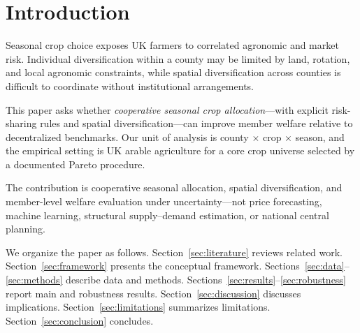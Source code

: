 \section{Introduction}
\label{sec:introduction}

Seasonal crop choice exposes UK farmers to correlated agronomic and market risk.
Individual diversification within a county may be limited by land, rotation, and local
agronomic constraints, while spatial diversification across counties is difficult to
coordinate without institutional arrangements.

This paper asks whether \emph{cooperative seasonal crop allocation}---with explicit
risk-sharing rules and spatial diversification---can improve member welfare relative to
decentralized benchmarks.
Our unit of analysis is county $\times$ crop $\times$ season, and the empirical setting
is UK arable agriculture for a core crop universe selected by a documented Pareto procedure.

\coppercontrib{}
The contribution is cooperative seasonal allocation, spatial diversification, and
member-level welfare evaluation under uncertainty---not price forecasting, machine learning,
structural supply--demand estimation, or national central planning.

We organize the paper as follows.
Section~\ref{sec:literature} reviews related work.
Section~\ref{sec:framework} presents the conceptual framework.
Sections~\ref{sec:data}--\ref{sec:methods} describe data and methods.
Sections~\ref{sec:results}--\ref{sec:robustness} report main and robustness results.
Section~\ref{sec:discussion} discusses implications.
Section~\ref{sec:limitations} summarizes limitations.
Section~\ref{sec:conclusion} concludes.
